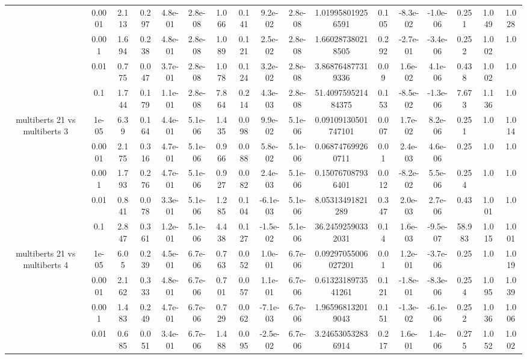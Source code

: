 \begin{tabular}{|c|c|c|c|c|c|c|c|c|c|c|c|c|c|c|c|c|}
 & 0.0001 & 2.113 & 0.297 & 4.8e-01 & 2.8e-08 & 1.066 & 0.141 & 9.2e-02 & 2.8e-08 & 1.019958019256591 & 0.105 & -8.3e-02 & -1.0e-06 & 0.251 & 1.049 & 1.028 \\
 & 0.001 & 1.694 & 0.238 & 4.8e-01 & 2.8e-08 & 1.089 & 0.121 & 2.5e-02 & 2.8e-08 & 1.660287380218505 & 0.292 & -2.7e-01 & -3.4e-06 & 0.252 & 1.002 & 1.0 \\
 & 0.01 & 0.775 & 0.047 & 3.7e-01 & 2.8e-08 & 1.078 & 0.124 & 3.2e-02 & 2.8e-08 & 3.868764877319336 & 0.09 & 1.6e-02 & 4.1e-06 & 0.438 & 1.002 & 1.0 \\
 & 0.1 & 1.744 & 0.179 & 1.1e-01 & 2.8e-08 & 7.864 & 0.214 & 4.3e-03 & 2.8e-08 & 51.409759521484375 & 0.153 & -8.5e-02 & -1.3e-06 & 7.673 & 1.136 & 1.0 \\
\hline
\multirow{5}{*}{multiberts 21 vs multiberts 3} & 1e-05 & 6.39 & 0.164 & 4.4e-01 & 5.1e-06 & 1.435 & 0.098 & 9.9e-02 & 5.1e-06 & 0.09109130501747101 & 0.007 & 1.7e-02 & 8.2e-06 & 0.251 & 1.0 & 1.014 \\
 & 0.0001 & 2.175 & 0.316 & 4.7e-01 & 5.1e-06 & 0.966 & 0.088 & 5.8e-02 & 5.1e-06 & 0.068747699260711 & 0.01 & 2.4e-03 & 4.6e-06 & 0.25 & 1.0 & 1.0 \\
 & 0.001 & 1.793 & 0.276 & 4.7e-01 & 5.1e-06 & 0.927 & 0.082 & 2.4e-03 & 5.1e-06 & 0.150767087936401 & 0.012 & -8.2e-02 & 5.5e-06 & 0.254 & 1.0 & 1.0 \\
 & 0.01 & 0.841 & 0.078 & 3.3e-01 & 5.1e-06 & 1.285 & 0.104 & -6.1e-03 & 5.1e-06 & 8.05313491821289 & 0.347 & 2.0e-03 & 2.7e-06 & 0.43 & 1.001 & 1.0 \\
 & 0.1 & 2.847 & 0.361 & 1.2e-01 & 5.1e-06 & 4.438 & 0.127 & -1.5e-02 & 5.1e-06 & 36.24592590332031 & 0.14 & 1.6e-03 & -9.5e-07 & 58.983 & 1.015 & 1.001 \\
\hline
\multirow{5}{*}{multiberts 21 vs multiberts 4} & 1e-05 & 6.05 & 0.239 & 4.5e-01 & 6.7e-06 & 0.763 & 0.052 & 1.0e-01 & 6.7e-06 & 0.09297055006027201 & 0.01 & 1.2e-01 & -3.7e-06 & 0.25 & 1.0 & 1.019 \\
 & 0.0001 & 2.162 & 0.333 & 4.8e-01 & 6.7e-06 & 0.701 & 0.057 & 1.1e-01 & 6.7e-06 & 0.6132318973541261 & 0.121 & -1.8e-01 & -8.3e-06 & 0.254 & 1.095 & 1.039 \\
 & 0.001 & 1.483 & 0.249 & 4.7e-01 & 6.7e-06 & 0.729 & 0.062 & -7.1e-03 & 6.7e-06 & 1.965968132019043 & 0.151 & -1.3e-02 & -6.1e-06 & 0.252 & 1.036 & 1.006 \\
 & 0.01 & 0.685 & 0.051 & 3.4e-01 & 6.7e-06 & 1.488 & 0.095 & -2.5e-02 & 6.7e-06 & 3.246530532836914 & 0.217 & 1.6e-01 & 1.4e-06 & 0.275 & 1.052 & 1.002 \\

\end{tabular}
